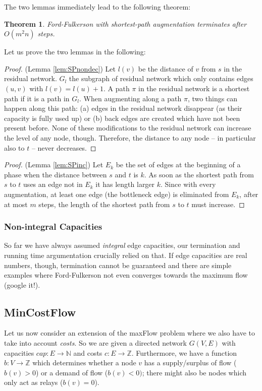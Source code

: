\documentclass{article}
\newtheorem{theorem}{Theorem}
\begin{document}
The two lemmas immediately lead to the following theorem:
\begin{theorem}
Ford-Fulkerson with shortest-path augmentation terminates after $O(m^2n)$ steps.
\end{theorem}

Let us prove the two lemmas in the following:
\begin{proof}(Lemma \ref{lem:SPnondec})
Let $l(v)$ be the distance of $v$ from $s$ in the residual network. $G_l$ the subgraph of residual network which only contains edges $(u,v)$ with $l(v)=l(u)+1$. A path $\pi$ in the residual network is a shortest path if it is a path in $G_l$. When augmenting along a path $\pi$, two things can happen along this path: (a) edges in the residual network disappear (as their capacity is fully used up) or (b) back edges are created which have not been present before. None of these modifications to the residual network can increase the level of any node, though. Therefore, the distance to any node -- in particular also to $t$ -- never decreases.
\end{proof}

\begin{proof}(Lemma \ref{lem:SPinc})
Let $E_k$ be the set of edges at the beginning of a phase when the distance between $s$ and $t$ is $k$. As soon as the shortest path from $s$ to $t$ uses an edge not in $E_k$ it has length larger $k$. Since with every augmentation, at least one edge (the bottleneck edge) is eliminated from $E_k$, after at most $m$ steps, the length of the shortest path from $s$ to $t$ must increase.
\end{proof}

\subsubsection{Non-integral Capacities}
So far we have always assumed \emph{integral} edge capacities, our termination and running time argumentation crucially relied on that. If edge capacities are real numbers, though, termination cannot be guaranteed and there are simple examples where Ford-Fulkerson not even converges towards the maximum flow (google it!).



\subsection{MinCostFlow}
Let us now consider an extension of the maxFlow problem where we also have to take into account \emph{costs}.
So we are given a directed network $G(V,E)$ with capacities $cap:E\rightarrow \mathbb{N}$ and costs $c:E\rightarrow \mathbb{Z}$. Furthermore, we have a function $b:V\rightarrow \mathbb{Z}$ which determines whether a node $v$ has a supply/surplus of flow ($b(v)>0$) or a demand of flow ($b(v)<0)$; there might also be nodes which only act as relays ($b(v)=0$).
\end{document}
